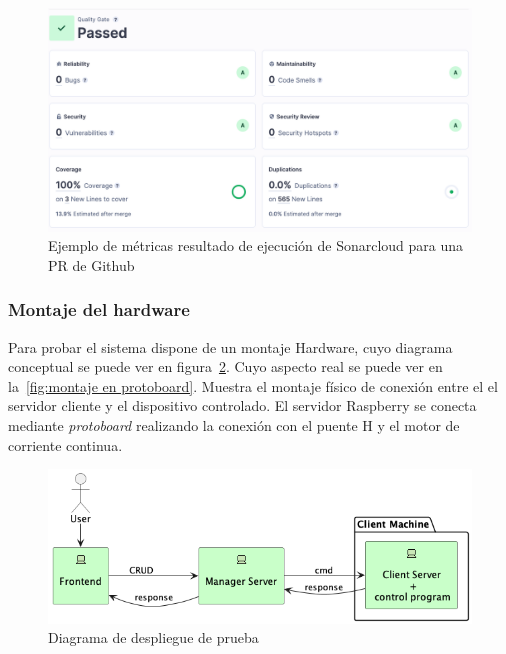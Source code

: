 \begin{figure}[H]
    \centering
    \includegraphics[height=0.35\textheight]{./part/Ejecucion/Seguimiento/PuestaAPunto/img/Sonarcloud Pr pipe}
    \caption{Ejemplo de métricas resultado de ejecución de Sonarcloud para una PR de Github}\label{fig:sonarcloudPR}
\end{figure}

\subsubsection{Montaje del hardware}

Para probar el sistema dispone de un montaje Hardware, cuyo diagrama conceptual se puede ver en  figura~\cref{fig:despliegue de prueba}.
Cuyo aspecto real se puede ver en la~\cref{fig:montaje en protoboard}.
Muestra el montaje físico de conexión entre el el servidor cliente y el dispositivo controlado.
El servidor Raspberry se conecta mediante \textit{protoboard} realizando la conexión con el puente H y el motor de corriente continua.

\begin{figure}[H]
    \centering
    \includegraphics[height=0.2\textheight]{./part/Ejecucion/Seguimiento/PuestaAPunto/img/deploy}
    \caption{Diagrama de despliegue de prueba}\label{fig:despliegue de prueba}
\end{figure}

